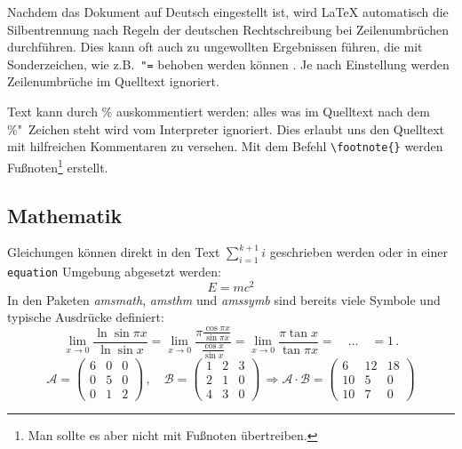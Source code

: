 Nachdem das Dokument auf Deutsch eingestellt ist, wird \LaTeX{} automatisch die Silbentrennung nach Regeln der deutschen Rechtschreibung bei Zeilenumbrüchen durchführen. Dies kann oft auch zu ungewollten Ergebnissen führen, die mit Sonderzeichen, wie z.B.\ \verb+"=+ behoben werden können \cite{Silbentrennung}.
Je nach Einstellung werden Zeilenumbrüche im Quelltext ignoriert.

Text kann durch \% auskommentiert werden: alles was im Quelltext nach dem \%"~Zeichen steht wird vom Interpreter ignoriert. Dies erlaubt uns den Quelltext mit hilfreichen Kommentaren zu versehen. %
Mit dem Befehl \verb"\footnote{}" werden Fußnoten\footnote{Man sollte es aber nicht mit Fußnoten übertreiben.} erstellt.
\subsection{Mathematik}
\label{subsec:Mathematik}
Gleichungen können direkt in den Text $\sum_{i=1}^{k+1}i$ geschrieben werden oder in einer \verb"equation" Umgebung abgesetzt werden:
\begin{equation}
E=mc^2 \label{eq:einstein}
\end{equation}
In den Paketen \textit{amsmath}, \textit{amsthm} und \textit{amssymb} sind bereits viele Symbole und typische Ausdrücke definiert:
\begin{equation}
\label{eq:abg}
\lim_{x \to 0} \frac{\ln \sin \pi x}{\ln \sin x} = 
     \lim_{x \to 0} \frac{\pi \frac{\cos \pi x}{\sin \pi x} }{ \frac{\cos x}{\sin x} } =
     \lim_{x \to 0} \frac{\pi \tan x}{\tan \pi x} = \quad \ldots \quad = 1 \, .
\end{equation}
\begin{equation}
\label{eq:matrix}
\mathcal{A} = \left( \begin{array}{ccc} 6 & 0 & 0 \\ 0 & 5 & 0 \\ 0 & 1 & 2 \end{array} \right)\, , \quad
\mathcal{B} = \left( \begin{array}{ccc} 1 & 2 & 3 \\ 2 & 1 & 0 \\ 4 & 3 & 0 \end{array} \right)\, \Rightarrow
\mathcal{A} \cdot \mathcal{B} = \left( \begin{array}{ccc} 6 & 12 & 18 \\ 10 & 5 & 0 \\ 10 & 7 & 0 \end{array} \right)
\end{equation}
